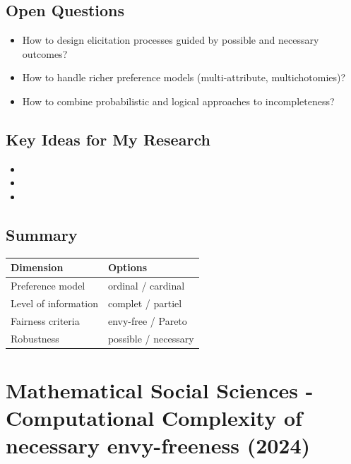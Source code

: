 \documentclass[12pt,a4paper]{article}
\begin{document}
\subsection*{Open Questions}
\begin{itemize}
    \item How to design elicitation processes guided by possible and necessary outcomes?
    \item How to handle richer preference models (multi-attribute, multichotomies)?
    \item How to combine probabilistic and logical approaches to incompleteness?
\end{itemize}

\subsection*{Key Ideas for My Research}
\label{subsec:relevance3}
\begin{itemize}
    \item 
    \item 
    \item  
\end{itemize}
\subsection*{Summary}

\begin{center}
\begin{tabular}{ll}
\toprule
\textbf{Dimension} & \textbf{Options} \\
\midrule
Preference model & ordinal / cardinal \\
Level of information & complet / partiel \\
Fairness criteria & envy-free / Pareto \\
Robustness & possible / necessary \\
\bottomrule
\end{tabular}
\end{center}


\newpage


\section{Mathematical Social Sciences - Computational Complexity of necessary envy-freeness (2024)}
\label{sec:article4}
\end{document}
